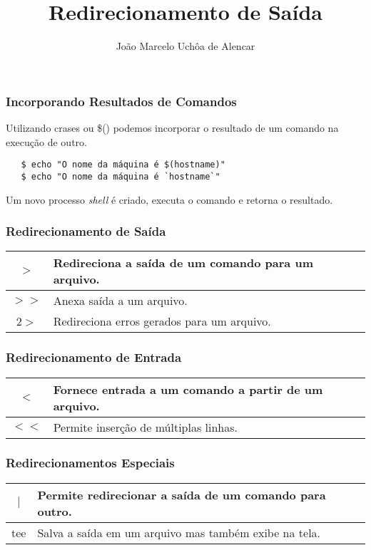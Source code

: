 \documentclass{beamer}
\title{Redirecionamento de Saída}
\author[João Marcelo Uchôa de Alencar]{João Marcelo Uchôa de Alencar}
\institute{Universidade Federal do Ceará - Quixadá}
\begin{document}
   \begin{frame}
      \titlepage
   \end{frame}

\begin{frame}[fragile]
   \frametitle{Incorporando Resultados de Comandos}
   Utilizando crases ou \$() podemos incorporar o resultado de um comando na execução de outro. \\
   \begin{verbatim}
   $ echo "O nome da máquina é $(hostname)" 
   $ echo "O nome da máquina é `hostname`" 
   \end{verbatim}
   Um novo processo \textit{shell} é criado, executa o comando e retorna o resultado.
\end{frame}
   
   \begin{frame}
      \frametitle{Redirecionamento de Saída}
      \begin{table}
         \begin{tabular}{ c | l }
         $>$ & Redireciona a saída de um comando para um arquivo. \\
         \hline 
         $>>$ & Anexa saída a um arquivo. \\
         \hline 
         2$>$ & Redireciona erros gerados para um arquivo. \\
         \hline 
         \end{tabular}
      \end{table}
   \end{frame}

   \begin{frame}
      \frametitle{Redirecionamento de Entrada}
      \begin{table}
         \begin{tabular}{ c | l }
         $<$ & Fornece entrada a um comando a partir de um arquivo. \\
         \hline 
         $<<$ & Permite inserção de múltiplas linhas. \\
         \hline 
         \end{tabular}
      \end{table}
   \end{frame}

  \begin{frame}
      \frametitle{Redirecionamentos Especiais}
      \begin{table}
         \begin{tabular}{ c | l }
         $|$ & Permite redirecionar a saída de um comando para outro. \\
         \hline 
         tee & Salva a saída em um arquivo mas também exibe na tela. \\
         \hline 
         \end{tabular}
      \end{table}
   \end{frame}
\end{document}
